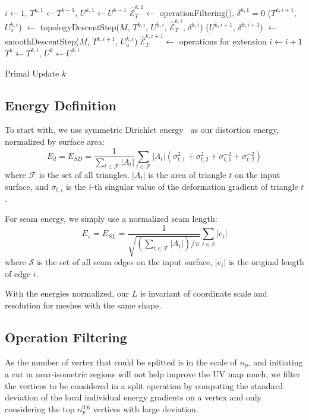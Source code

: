 \begin{algorithm}[h]
\SetAlgoLined
{}
$i \leftarrow 1$, $T^{k,1} \leftarrow T^{k-1}$, $U^{k,1} \leftarrow U^{k-1}$\;
$\hat{\mathcal{E}}^{k,1}_T \leftarrow$ operationFiltering(), $\delta^{k,1} = 0$\;
{
	($T^{k,i+1}$, $U_a^{k,i}$) $\leftarrow$ topologyDescentStep($M$, $T^{k,i}$, $U^{k,i}$, $\hat{\mathcal{E}}^{k,i}_T$, $\delta^{k,i}$)\;
	($U^{k,i+1}$, $\delta^{k,i+1}$) $\leftarrow$ smoothDescentStep($M$, $T^{k,i+1}$, $U_a^{k,i}$)\;
	$\hat{\mathcal{E}}^{k,i+1}_T \leftarrow$ operations for extension\;
	$i \leftarrow i+1$\;
}
$T^k \leftarrow T^{k,i}$, $U^k \leftarrow U^{k,i}$
\caption{Primal Update $k$}
\label{alg:DCSearch}
\end{algorithm}

\subsection{Energy Definition}

To start with, we use symmetric Dirichlet energy~\cite{Smith2015Bijective} as our distortion energy, normalized by surface area:
\[ E_d = E_{SD} = \frac{1}{\sum_{t\in\mathcal{F}} |A_t|} \sum_{t\in\mathcal{F}} |A_t|(\sigma_{t,1}^2 + \sigma_{t,2}^2 + \sigma_{t,1}^{-2} + \sigma_{t,2}^{-2}) \]
where $\mathcal{F}$ is the set of all triangles, $|A_t|$ is the area of triangle $t$ on the input surface, and $\sigma_{t,i}$ is the $i$-th singular value of the deformation gradient of triangle $t$.

For seam energy, we simply use a normalized seam length:
\[ E_s = E_{SL} = \frac{1}{\sqrt{(\sum_{t\in\mathcal{F}} |A_t|)/\pi}} \sum_{i \in \mathcal{S}} |e_i| \]
where $\mathcal{S}$ is the set of all seam edges on the input surface, $|e_i|$ is the original length of edge $i$.

With the energies normalized, our $L$ is invariant of coordinate scale and resolution for meshes with the same shape.






\subsection{Operation Filtering}
\label{sec:operationFiltering}
As the number of vertex that could be splitted is in the scale of $n_p$, and initiating a cut in near-isometric regions will not help improve the UV map much, we filter the vertices to be considered in a split operation by computing the standard deviation of the local individual energy gradients on a vertex and only considering the top $n_p^{0.6}$ vertices with large deviation. 

